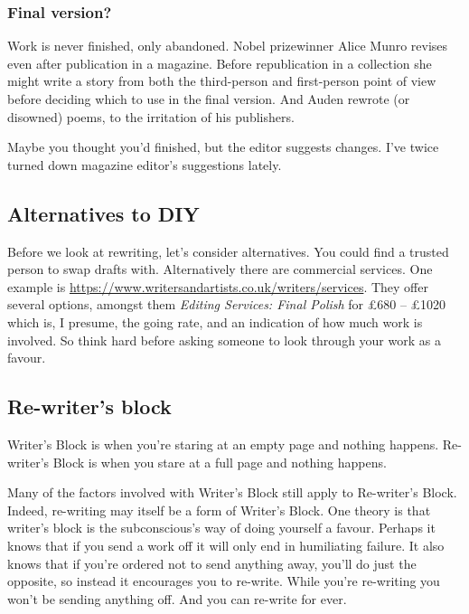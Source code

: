 \documentclass[11pt]{article}
\begin{document}


\subsubsection*{Final version?}
Work is never finished, only abandoned. Nobel prizewinner Alice Munro revises even after publication in a magazine. Before republication in a collection she might write a story from both the third-person and first-person point of view before deciding which to use in the final version. And Auden 
rewrote (or disowned) poems, to the irritation of his publishers.

Maybe you thought you'd finished, but the editor suggests changes. I've twice
turned down magazine editor's suggestions lately.


\subsection*{Alternatives to DIY}
Before we look at rewriting, let's consider alternatives. You could
find a trusted person to swap drafts with. Alternatively 
there are commercial services. One example is \url{https://www.writersandartists.co.uk/writers/services}. They offer several options, amongst them \textit{Editing Services: Final Polish} for £680 – £1020 which is, I presume, the going rate, and an indication of how much work is involved. So think hard before asking someone to look through your work as a favour.


\subsection*{Re-writer's block}
Writer's Block is when you're staring at an empty page and nothing happens. Re-writer's Block is when you stare at a full page and nothing happens.

Many of the factors involved with Writer's Block still apply to Re-writer's Block. Indeed, re-writing may itself be a form of Writer's Block. One theory is that writer's block is the subconscious's way of doing yourself a favour. Perhaps it knows that if you send a work off it will only end in humiliating failure. It also knows that if you're ordered not to send anything away, you'll do just the opposite, so instead it encourages you to re-write. While you're re-writing you won't be sending anything off. And you can re-write for ever.

\end{document}
